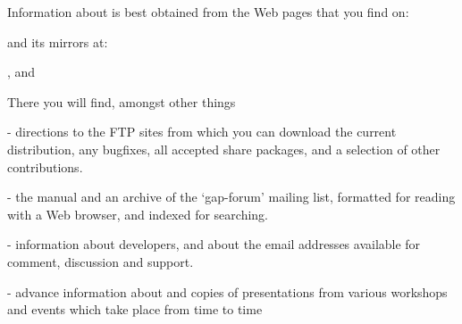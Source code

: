 





Information about {\GAP} is best obtained from the {\GAP} Web pages that
you find on:


and its mirrors at:

,
 and

There you will find, amongst other things
\beginlist
\item{-} directions to the FTP sites from which you can download the
current {\GAP} distribution, any bugfixes, all accepted share packages,
and a selection of other contributions.
\item{-} the {\GAP} manual and an archive of the `gap-forum' mailing
list, formatted for reading with a Web browser, and indexed for
searching.
\item{-} information about {\GAP} developers, and about the email
addresses available for comment, discussion and support.
\item{-} advance information about and copies of presentations from
various {\GAP} workshops and events which take place from time to time
\endlist

